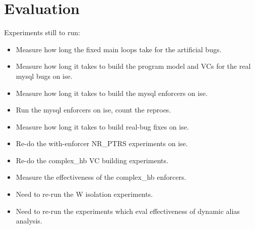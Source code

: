 \newcommand{\biggraph}[1]{}

\chapter{Evaluation}
\label{chapter:eval}

Experiments still to run:

\begin{itemize}
\item Measure how long the fixed main loops take for the artificial bugs.
\item Measure how long it takes to build the program model and VCs for
  the real mysql bugs on ise.
\item Measure how long it takes to build the mysql enforcers on ise.
\item Run the mysql enforcers on ise, count the reproes.
\item Measure how long it takes to build real-bug fixes on ise.
\item Re-do the with-enforcer NR\_PTRS experiments on ise.
\item Re-do the complex\_hb VC building experiments.
\item Measure the effectiveness of the complex\_hb enforcers.
\item Need to re-run the W isolation experiments.
\item Need to re-run the experiments which eval effectiveness of
  dynamic alias analysis.
\end{itemize}

